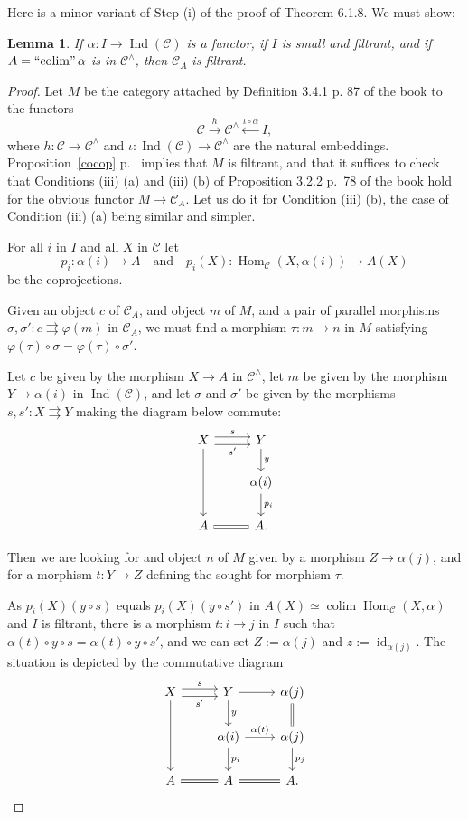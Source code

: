 \documentclass[12pt]{article}
\newtheorem{lem}[thm]{Lemma}
\newtheorem{prop}[thm]{Proposition}
\theoremstyle{remark}
\theoremstyle{definition}
\newcommand{\C}{\mathcal C}
\newcommand{\pp}{\varphi}
\newcommand{\parar}{\rightrightarrows}
\DeclareMathOperator*{\colim}{colim}
\DeclareMathOperator*{\ic}{``\!\colim\!"}
\DeclareMathOperator{\id}{id}
\DeclareMathOperator{\Hom}{Hom}
\DeclareMathOperator{\Ind}{Ind}
\begin{document}

Here is a minor variant of Step (i) of the proof of Theorem 6.1.8. We must show:  

\begin{lem} 
If $\alpha:I\to\Ind(\C)$ is a functor, if $I$ is small and filtrant, and if $A=\ic\alpha$ is in $\C^\wedge$, then $\C_A$ is filtrant. 
\end{lem} 

\begin{proof}
Let $M$ be the category attached by Definition 3.4.1 p. 87 of the book to the functors 
$$
\C\xrightarrow h\C^\wedge\xleftarrow{\iota\circ\alpha}I,
$$ 
where $h:\C\to\C^\wedge$ and $\iota:\Ind(\C)\to\C^\wedge$ are the natural embeddings. Proposition~\ref{cocop} p.~\pageref{cocop} implies that $M$ is filtrant, and that it suffices to check that Conditions (iii) (a) and (iii) (b) of Proposition 3.2.2 p.~78 of the book hold for the obvious functor $M\to\C_A$. Let us do it for Condition (iii) (b), the case of Condition (iii) (a) being similar and simpler. 

For all $i$ in $I$ and all $X$ in $\C$ let 
$$
p_i:\alpha(i)\to A\quad\text{and}\quad p_i(X):\Hom_\C(X,\alpha(i))\to A(X)
$$
be the coprojections.

Given an object $c$ of $\C_A$, and object $m$ of $M$, and a pair of parallel morphisms $\sigma,\sigma':c\parar\pp(m)$ in $\C_A$, we must find a morphism $\tau:m\to n$ in $M$ satisfying $\pp(\tau)\circ\sigma=\pp(\tau)\circ\sigma'$. 

Let $c$ be given by the morphism $X\to A$ in $\C^\wedge$, let $m$ be given by the morphism $Y\to\alpha(i)$ in $\Ind(\C)$, and let $\sigma$ and $\sigma'$ be given by the morphisms $s,s':X\parar Y$ making the diagram below commute:
$$
\begin{tikzcd}
X\ar{dd}\ar[yshift=0.7ex]{r}{s}\ar[yshift=-0.7ex]{r}[swap]{s'}&Y\ar{d}{y}\\ 
{}&\alpha(i)\ar{d}{p_i}\\ 
A\ar[equal]{r}&A.
\end{tikzcd}
$$ 

Then we are looking for and object $n$ of $M$ given by a morphism $Z\to\alpha(j)$, and for a morphism $t:Y\to Z$ defining the sought-for morphism $\tau$. 

As $p_i(X)(y\circ s)$ equals $p_i(X)(y\circ s')$ in $A(X)\simeq\colim\Hom_\C(X,\alpha)$ and $I$ is filtrant, there is a morphism $t:i\to j$ in $I$ such that $\alpha(t)\circ y\circ s=\alpha(t)\circ y\circ s'$, and we can set $Z:=\alpha(j)$ and $z:=\id_{\alpha(j)}$. The situation is depicted by the commutative diagram
$$
\begin{tikzcd}
X\ar{dd}\ar[yshift=0.7ex]{r}{s}\ar[yshift=-0.7ex]{r}[swap]{s'}&Y\ar{d}{y}\ar{r}&\alpha(j)\ar[equal]{d}\\ 
{}&\alpha(i)\ar{d}{p_i}\ar{r}{\alpha(t)}&\alpha(j)\ar{d}{p_j}\\ 
A\ar[equal]{r}&A\ar[equal]{r}&A.
\end{tikzcd}
$$
\end{proof}
\end{document}
